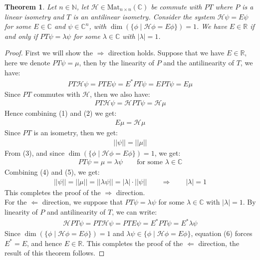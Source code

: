 \documentclass[1pt]{book}
\theoremstyle{break}
\theoremstyle{break}
\newtheorem{thm}{Theorem}[section]
\newcommand{\R}{\mathbb{R}}
\newcommand{\N}{\mathbb{N}}
\newcommand{\Complex}{\mathbb{C}}
\begin{document}
\begin{thm}
Let $n \in \N$, let $\mathcal{H} \in \text{Mat}_{n\times n}(\Complex)$ be commute with $PT$ where $P$ is a linear isometry and $T$ is an antilinear isometry. Consider the system $\mathcal{H}\psi	 = E\psi$ for some $E \in \Complex$ and $\psi \in \Complex^n$, with $\dim(\{\phi \mid \mathcal{H}\phi = E\phi\}) =1$. We have $E \in \R$ if and only if $PT \psi = \lambda \psi$ for some $\lambda \in \Complex$ with $|\lambda| = 1$.
\end{thm}
\begin{proof}
First we will show the $\Rightarrow$ direction holds. Suppose that we have $E \in \R$, here we denote $PT \psi = \mu$, then by the linearity of $P$ and the antilinearity of $T$, we have:
\begin{align*}
PT \mathcal{H}\psi = PT E\psi = E^* PT \psi = E PT \psi = E\mu \tag{1}
\end{align*}
Since $PT$ commutes with $\mathcal{H}$, then we also have:
\begin{align*}
PT \mathcal{H} \psi =\mathcal{H} PT \psi = \mathcal{H} \mu \tag{2}
\end{align*}
Hence combining (1) and (2) we get:
\begin{align*}
E\mu = \mathcal{H}\mu \tag{3}
\end{align*}
Since $PT$ is an isometry, then we get:
\begin{align*}
||\psi|| = ||\mu|| \tag{4}
\end{align*}
From (3), and since $\dim(\{ \phi \mid \mathcal{H}\phi = E\phi\}) = 1$, we get:
\begin{align*}
PT \psi = \mu = \lambda \psi  \qquad \text{for some }\lambda \in \Complex \tag{5}
\end{align*}
Combining (4) and (5), we get:
\begin{align*}
||\psi|| = ||\mu|| = ||\lambda\psi|| = |\lambda | \cdot ||\psi|| \qquad \Rightarrow \qquad |\lambda | = 1
\end{align*}
This completes the proof of the $\Rightarrow$ direction.\\
For the $\Leftarrow$ direction, we suppose that $PT\psi= \lambda \psi$ for some $\lambda \in \Complex$ with $|\lambda| = 1$. By linearity of $P$ and antilinearity of $T$, we can write:
\begin{align*}
\mathcal{H}PT\psi =  PT\mathcal{H}\psi = PT E\psi = E^* PT\psi = E^*\lambda \psi \tag{6}
\end{align*}
Since $\dim(\{ \phi \mid \mathcal{H}\phi = E\phi\}) = 1$ and $\lambda \psi \in \{ \phi \mid \mathcal{H}\phi = E\phi\}$, equation (6) forces $E^* = E$, and hence $E \in \R$. This completes the proof of the $\Leftarrow$ direction, the result of this theorem follows.
\end{proof}
\end{document}
